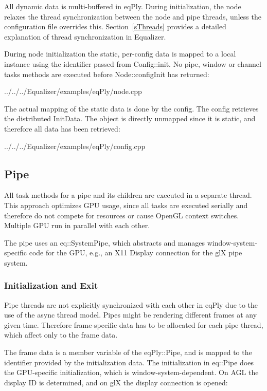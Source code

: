 \documentclass[10pt,a4]{scrartcl}
\newcommand{\sref}[1]{Section~\ref{#1}}
\begin{document}
All dynamic data is multi-buffered in \textsf{eqPly}. During
initialization, the node relaxes the thread synchronization between the
node and pipe threads, unless the configuration file overrides
this. \sref{sThreads} provides a detailed explanation of thread
synchronization in Equalizer.

During node initialization the static, per-config data is mapped to a
local instance using the identifier passed from
\textsf{Config::init}. No pipe, window or channel tasks methods are
executed before \textsf{Node::configInit} has returned:

{\footnotesize
  {../../../Equalizer/examples/eqPly/node.cpp}}

The actual mapping of the static data is done by the config. The config
retrieves the distributed \textsf{InitData}. The object is directly unmapped
since it is static, and therefore all data has been retrieved:

{\footnotesize
  {../../../Equalizer/examples/eqPly/config.cpp}}

\subsection{Pipe}

All task methods for a pipe and its children are executed in a separate
thread. This approach optimizes GPU usage, since all tasks are executed serially
and therefore do not compete for resources or cause OpenGL context
switches. Multiple GPU run in parallel with each other.

The pipe uses an \textsf{eq::SystemPipe}, which abstracts and manages
window-system-specific code for the GPU, e.g., an X11 \textsf{Display}
connection for the glX pipe system.

\subsubsection{Initialization and Exit}

Pipe threads are not explicitly synchronized with each other in \textsf{eqPly}
due to the use of the async thread model. Pipes might be rendering different
frames at any given time. Therefore frame-specific data has to be allocated for
each pipe thread, which affect only to the frame data.

The frame data is a member variable of the \textsf{eqPly::Pipe}, and is mapped
to the identifier provided by the initialization data. The initialization in
\textsf{eq::Pipe} does the GPU-specific initialization, which is
window-system-dependent. On AGL the display ID is determined, and on glX the
display connection is opened:
\end{document}
